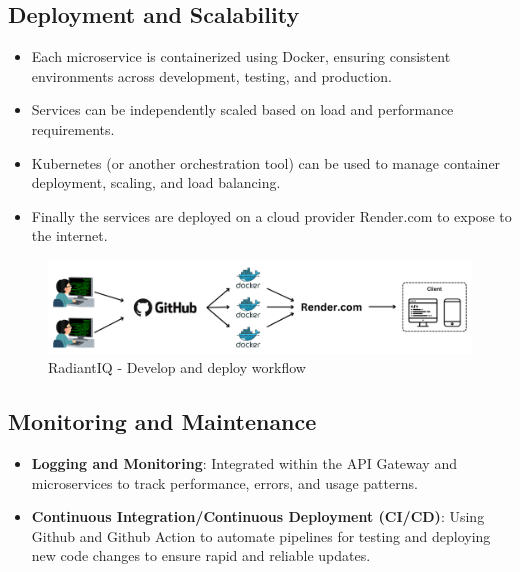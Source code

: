 \subsection{Deployment and Scalability}

\begin{itemize}
    \item Each microservice is containerized using Docker, ensuring consistent environments across development, testing, and production.
    \item Services can be independently scaled based on load and performance requirements.
    \item Kubernetes (or another orchestration tool) can be used to manage container deployment, scaling, and load balancing.
    \item Finally the services are deployed on a cloud provider Render.com to expose to the internet.
\end{itemize}

\begin{figure}[H]
	\centering
	\includegraphics[width=1.0\linewidth]{images/deploy-workflow.png}
	\caption{RadiantIQ - Develop and deploy workflow}
	\label{fig:deploy-workflow}
\end{figure}

\subsection{Monitoring and Maintenance}

\begin{itemize}
    \item \textbf{Logging and Monitoring}: Integrated within the API Gateway and microservices to track performance, errors, and usage patterns.
    \item \textbf{Continuous Integration/Continuous Deployment (CI/CD)}: Using Github and Github Action to automate pipelines for testing and deploying new code changes to ensure rapid and reliable updates.
\end{itemize}
